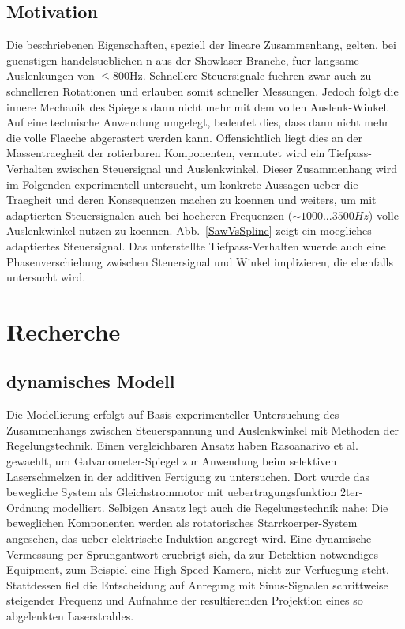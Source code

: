 \subsection{Motivation}
Die beschriebenen Eigenschaften, speziell der lineare Zusammenhang, gelten, bei guenstigen handelsueblichen \galvo n aus der Showlaser-Branche, fuer langsame Auslenkungen von $\le$800Hz. Schnellere Steuersignale fuehren zwar auch zu schnelleren Rotationen und erlauben somit schneller Messungen. Jedoch folgt die innere Mechanik des Spiegels dann  nicht mehr mit dem vollen Auslenk-Winkel. Auf eine technische Anwendung umgelegt, bedeutet dies, dass dann nicht mehr die volle Flaeche abgerastert werden kann. Offensichtlich liegt dies an der Massentraegheit der rotierbaren Komponenten, vermutet wird ein Tiefpass-Verhalten zwischen Steuersignal und Auslenkwinkel. Dieser Zusammenhang wird im Folgenden experimentell untersucht, um konkrete Aussagen ueber die Traegheit und deren Konsequenzen machen zu koennen und weiters, um mit adaptierten Steuersignalen auch bei hoeheren Frequenzen ($\sim 1000 ... 3500Hz$) volle Auslenkwinkel nutzen zu koennen. Abb.~\ref{SawVsSpline} zeigt ein moegliches adaptiertes Steuersignal. Das unterstellte Tiefpass-Verhalten wuerde auch eine Phasenverschiebung zwischen Steuersignal und Winkel implizieren, die ebenfalls untersucht wird.
\section{Recherche}
\subsection{dynamisches Modell}
Die Modellierung erfolgt auf Basis experimenteller Untersuchung des Zusammenhangs zwischen Steuerspannung und Auslenkwinkel mit Methoden der Regelungstechnik. Einen vergleichbaren Ansatz haben Rasoanarivo et al. \cite{SLMGalvos:Rasoanarivo} gewaehlt, um Galvanometer-Spiegel zur Anwendung beim selektiven Laserschmelzen in der additiven Fertigung zu untersuchen. Dort wurde das bewegliche System als Gleichstrommotor mit uebertragungsfunktion 2ter-Ordnung modelliert. Selbigen Ansatz legt auch die Regelungstechnik nahe: Die beweglichen Komponenten werden als rotatorisches Starrkoerper-System angesehen, das ueber elektrische Induktion angeregt wird. Eine dynamische Vermessung per Sprungantwort eruebrigt sich, da zur Detektion notwendiges Equipment, zum Beispiel eine High-Speed-Kamera, nicht zur Verfuegung steht. Stattdessen fiel die Entscheidung auf Anregung mit Sinus-Signalen schrittweise steigender Frequenz und Aufnahme der resultierenden Projektion eines so abgelenkten Laserstrahles.
